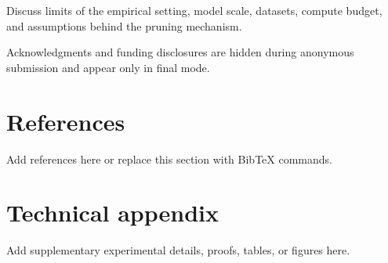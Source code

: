 \documentclass{article}
\begin{document}
Discuss limits of the empirical setting, model scale, datasets, compute budget,
and assumptions behind the pruning mechanism.

\begin{ack}
Acknowledgments and funding disclosures are hidden during anonymous submission
and appear only in final mode.
\end{ack}

\section*{References}

{\small
Add references here or replace this section with BibTeX commands.
}

\appendix

\section{Technical appendix}

Add supplementary experimental details, proofs, tables, or figures here.

\newpage

\end{document}

